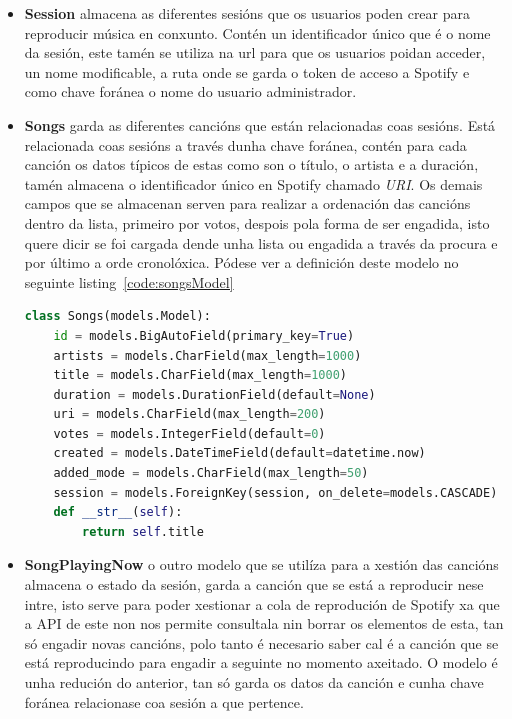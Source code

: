 \begin{itemize}
	\item \textbf{Session} almacena as diferentes sesións que os usuarios poden crear para reproducir música en conxunto. Contén un identificador único que é o nome da sesión, este tamén se utiliza na url para que os usuarios poidan acceder, un nome modificable, a ruta onde se garda o token de acceso a Spotify e como chave foránea o nome do usuario administrador.

    \item \textbf{Songs} garda as diferentes cancións que están relacionadas coas sesións. Está relacionada coas sesións a través dunha chave foránea, contén para cada canción os datos típicos de estas como son o título, o artista e a duración, tamén almacena o identificador único en Spotify chamado \textit{URI}. Os demais campos que se almacenan serven para realizar a ordenación das cancións dentro da lista, primeiro por votos, despois pola forma de ser engadida, isto quere dicir se foi cargada dende unha lista ou engadida a través da procura e por último a orde cronolóxica. Pódese ver a definición deste modelo no seguinte listing~\ref{code:songsModel}

\begin{lstlisting}[language=python, label={code:songsModel}, caption={models.py}]
class Songs(models.Model):
    id = models.BigAutoField(primary_key=True)
    artists = models.CharField(max_length=1000)
    title = models.CharField(max_length=1000)
    duration = models.DurationField(default=None)
    uri = models.CharField(max_length=200)
    votes = models.IntegerField(default=0)
    created = models.DateTimeField(default=datetime.now)
    added_mode = models.CharField(max_length=50)
    session = models.ForeignKey(session, on_delete=models.CASCADE)
    def __str__(self):
        return self.title  
\end{lstlisting}

	\item \textbf{SongPlayingNow} o outro modelo que se utilíza para a xestión das cancións almacena o estado da sesión, garda a canción que se está a reproducir nese intre, isto serve para poder xestionar a cola de reprodución de Spotify xa que a API de este non nos permite consultala nin borrar os elementos de esta, tan só engadir novas cancións, polo tanto é necesario saber cal é a canción que se está reproducindo para engadir a seguinte no momento axeitado. O modelo é unha redución do anterior, tan só garda os datos da canción e cunha chave foránea relacionase coa sesión a que pertence.


\end{itemize}
